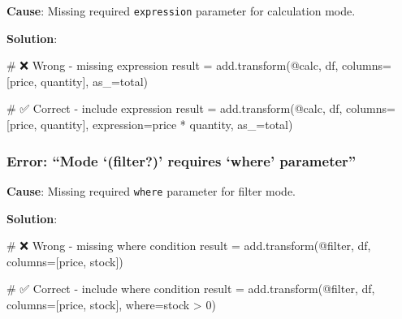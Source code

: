 \documentclass[
  letterpaper,
]{scrbook}
\newenvironment{Shaded}{\begin{snugshade}}{\end{snugshade}}
\newcommand{\CommentTok}[1]{\textcolor[rgb]{0.37,0.37,0.37}{#1}}
\newcommand{\NormalTok}[1]{\textcolor[rgb]{0.00,0.23,0.31}{#1}}
\newcommand{\OperatorTok}[1]{\textcolor[rgb]{0.37,0.37,0.37}{#1}}
\newcommand{\StringTok}[1]{\textcolor[rgb]{0.13,0.47,0.30}{#1}}
\begin{document}
\textbf{Cause}: Missing required \texttt{expression} parameter for
calculation mode.

\textbf{Solution}:

\begin{Shaded}
\begin{Highlighting}[]
\CommentTok{\# ❌ Wrong {-} missing expression}
\NormalTok{result }\OperatorTok{=}\NormalTok{ add.transform(}\StringTok{\textquotesingle{}@calc\textquotesingle{}}\NormalTok{, df, columns}\OperatorTok{=}\NormalTok{[}\StringTok{\textquotesingle{}price\textquotesingle{}}\NormalTok{, }\StringTok{\textquotesingle{}quantity\textquotesingle{}}\NormalTok{], as\_}\OperatorTok{=}\StringTok{\textquotesingle{}total\textquotesingle{}}\NormalTok{)}

\CommentTok{\# ✅ Correct {-} include expression}
\NormalTok{result }\OperatorTok{=}\NormalTok{ add.transform(}\StringTok{\textquotesingle{}@calc\textquotesingle{}}\NormalTok{, df, columns}\OperatorTok{=}\NormalTok{[}\StringTok{\textquotesingle{}price\textquotesingle{}}\NormalTok{, }\StringTok{\textquotesingle{}quantity\textquotesingle{}}\NormalTok{], }
\NormalTok{                       expression}\OperatorTok{=}\StringTok{\textquotesingle{}price * quantity\textquotesingle{}}\NormalTok{, as\_}\OperatorTok{=}\StringTok{\textquotesingle{}total\textquotesingle{}}\NormalTok{)}
\end{Highlighting}
\end{Shaded}

\subsubsection{\texorpdfstring{Error: ``Mode `(\textbf{filter?})'
requires `where'
parameter''}{Error: ``Mode `(filter?)' requires `where' parameter''}}\label{error-mode-filter-requires-where-parameter}

\textbf{Cause}: Missing required \texttt{where} parameter for filter
mode.

\textbf{Solution}:

\begin{Shaded}
\begin{Highlighting}[]
\CommentTok{\# ❌ Wrong {-} missing where condition}
\NormalTok{result }\OperatorTok{=}\NormalTok{ add.transform(}\StringTok{\textquotesingle{}@filter\textquotesingle{}}\NormalTok{, df, columns}\OperatorTok{=}\NormalTok{[}\StringTok{\textquotesingle{}price\textquotesingle{}}\NormalTok{, }\StringTok{\textquotesingle{}stock\textquotesingle{}}\NormalTok{])}

\CommentTok{\# ✅ Correct {-} include where condition}
\NormalTok{result }\OperatorTok{=}\NormalTok{ add.transform(}\StringTok{\textquotesingle{}@filter\textquotesingle{}}\NormalTok{, df, columns}\OperatorTok{=}\NormalTok{[}\StringTok{\textquotesingle{}price\textquotesingle{}}\NormalTok{, }\StringTok{\textquotesingle{}stock\textquotesingle{}}\NormalTok{], where}\OperatorTok{=}\StringTok{\textquotesingle{}stock \textgreater{} 0\textquotesingle{}}\NormalTok{)}
\end{Highlighting}
\end{Shaded}
\end{document}
